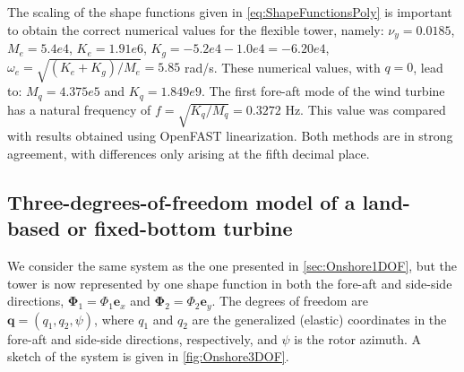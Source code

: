 \documentclass[wes, manuscript]{copernicus}
\renewcommand{\v}[1]{\boldsymbol{#1}}
\begin{document}
The scaling of the shape functions given in \autoref{eq:ShapeFunctionsPoly} is important to obtain the correct numerical values for the flexible tower, namely:
$\nu_y=0.0185$,
$M_e=5.4e4$,
$K_e=1.91e6$,
$K_g=  -5.2e4 -1.0e4 = -6.20e4$,
$\omega_e=\sqrt{(K_e+K_g)/M_e}=5.85$ \unit{rad/s}.
These numerical values, with $q=0$, lead to:
$M_q = 4.375e5$ and $K_q = 1.849e9$.
The first fore-aft mode of the wind turbine has a natural frequency of $f=\sqrt{K_q/M_q}=0.3272$ \unit{Hz}.
This value was compared with results obtained using OpenFAST linearization.
Both methods are in strong agreement, with differences only arising at the fifth decimal place.








\subsection{Three-degrees-of-freedom model of a land-based or fixed-bottom turbine}
\label{sec:Onshore3DOF}
We consider the same system as the one presented in \autoref{sec:Onshore1DOF}, but 
the tower is now represented by one shape function in both the fore-aft and side-side directions, $\v{\Phi}_1=\Phi_1 \v{e}_x$ and $\v{\Phi}_2=\Phi_2\v{e}_y$.
The degrees of freedom are $\v{q}=(q_1, q_2, \psi)$, where $q_1$ and $q_2$ are the generalized (elastic) coordinates in the fore-aft and side-side directions, respectively, and $\psi$ is the rotor azimuth.
A sketch of the system is given in \autoref{fig:Onshore3DOF}. 
\end{document}
